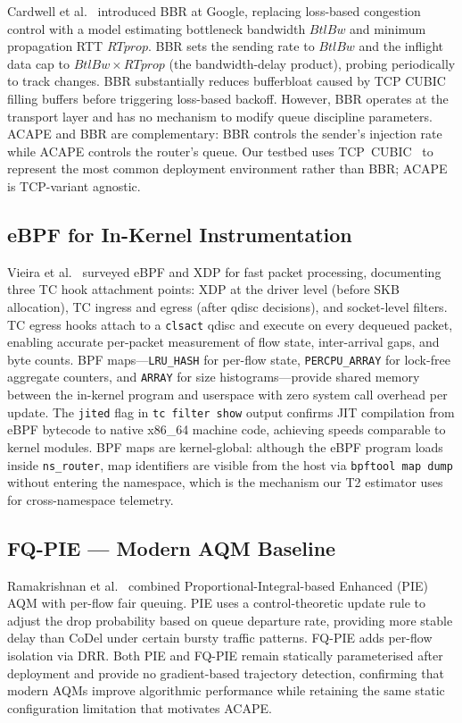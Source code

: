 \documentclass[conference]{IEEEtran}
\begin{document}
Cardwell et al.~\cite{bbr2016} introduced BBR at Google, replacing
loss-based congestion control with a model estimating bottleneck bandwidth
$\mathit{BtlBw}$ and minimum propagation RTT $\mathit{RTprop}$. BBR sets the
sending rate to $\mathit{BtlBw}$ and the inflight data cap to
$\mathit{BtlBw} \times \mathit{RTprop}$ (the bandwidth-delay product), probing
periodically to track changes. BBR substantially reduces bufferbloat caused by
TCP CUBIC filling buffers before triggering loss-based backoff. However, BBR
operates at the transport layer and has no mechanism to modify queue discipline
parameters. ACAPE and BBR are complementary: BBR controls the sender's
injection rate while ACAPE controls the router's queue. Our testbed uses
TCP~CUBIC~\cite{cubic2008} to represent the most common deployment environment
rather than BBR; ACAPE is TCP-variant agnostic.

\subsection{eBPF for In-Kernel Instrumentation}

Vieira et al.~\cite{vieira2020} surveyed eBPF and XDP for fast packet
processing, documenting three TC hook attachment points: XDP at the driver
level (before SKB allocation), TC ingress and egress (after qdisc decisions),
and socket-level filters. TC egress hooks attach to a \texttt{clsact} qdisc
and execute on every dequeued packet, enabling accurate per-packet measurement
of flow state, inter-arrival gaps, and byte counts. BPF maps---\texttt{LRU\_HASH}
for per-flow state, \texttt{PERCPU\_ARRAY} for lock-free aggregate counters,
and \texttt{ARRAY} for size histograms---provide shared memory between the
in-kernel program and userspace with zero system call overhead per update. The
\texttt{jited} flag in \texttt{tc filter show} output confirms JIT compilation
from eBPF bytecode to native x86\_64 machine code, achieving speeds comparable
to kernel modules. BPF maps are kernel-global: although the eBPF program loads
inside \texttt{ns\_router}, map identifiers are visible from the host via
\texttt{bpftool map dump} without entering the namespace, which is the
mechanism our T2 estimator uses for cross-namespace telemetry.

\subsection{FQ-PIE --- Modern AQM Baseline}

Ramakrishnan et al.~\cite{fqpie2019} combined Proportional-Integral-based
Enhanced (PIE) AQM with per-flow fair queuing. PIE uses a control-theoretic
update rule to adjust the drop probability based on queue departure rate,
providing more stable delay than CoDel under certain bursty traffic patterns.
FQ-PIE adds per-flow isolation via DRR. Both PIE and FQ-PIE remain statically
parameterised after deployment and provide no gradient-based trajectory
detection, confirming that modern AQMs improve algorithmic performance while
retaining the same static configuration limitation that motivates ACAPE.
\end{document}
